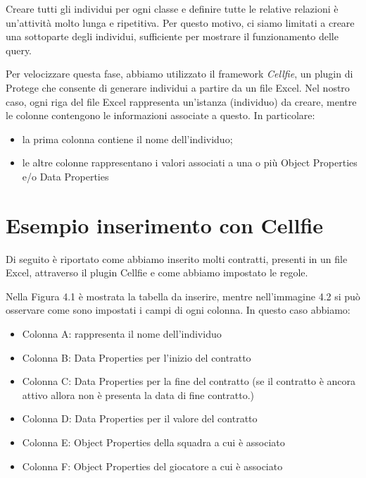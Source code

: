 \documentclass[11pt]{report} %
\begin{document}
\hfill

Creare tutti gli individui per ogni classe e definire tutte le relative relazioni è un'attività molto lunga e ripetitiva. Per questo motivo, ci siamo limitati a creare una sottoparte degli individui, sufficiente per mostrare il funzionamento delle query.

\hfill

Per velocizzare questa fase, abbiamo utilizzato il framework \textit{Cellfie}, un plugin di Protege che consente di generare individui a partire da un file Excel.
Nel nostro caso, ogni riga del file Excel rappresenta un'istanza (individuo) da creare, mentre le colonne contengono le informazioni associate a questo. In particolare:

\begin{itemize}
\item la prima colonna contiene il nome dell'individuo;
\item le altre colonne rappresentano i valori associati a una o più Object Properties e/o Data Properties
\end{itemize}
\newpage
\section{Esempio inserimento con Cellfie}
Di seguito è riportato come abbiamo inserito molti contratti, presenti in un file Excel, attraverso il plugin Cellfie e come abbiamo impostato le regole.

\hfill

Nella Figura 4.1 è mostrata la tabella da inserire, mentre nell'immagine 4.2 si può osservare come sono impostati i campi di ogni colonna.
In questo caso abbiamo:
\begin{itemize}
    \item Colonna A: rappresenta il nome dell'individuo
    \item Colonna B: Data Properties per l'inizio del contratto
    \item Colonna C: Data Properties per la fine del contratto (se il contratto è ancora attivo allora non è presenta la data di fine contratto.)
    \item Colonna D: Data Properties per il valore del contratto
    \item Colonna E: Object Properties della squadra a cui è associato
    \item Colonna F: Object Properties del giocatore a cui è associato
\end{itemize}

\hfill
\end{document}
